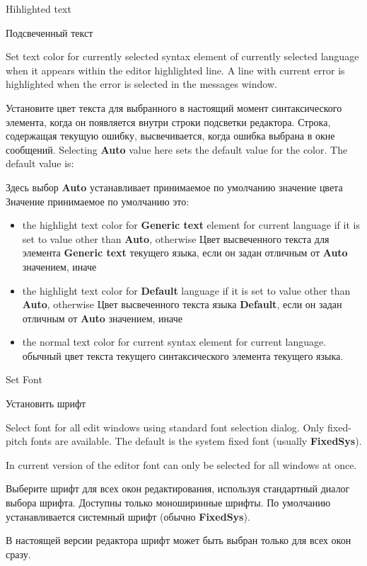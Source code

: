 \begin{popup}
\ifenglish
\caption{Hihlighted text}
\else
\caption{Подсвеченный текст}
\fi
{}

\ifenglish
Set text color for currently selected syntax element of currently selected
language when it appears within the editor highlighted line.
A line with current error is highlighted when the error is selected in the
messages window.

\else
Установите цвет текста для выбранного в настоящий момент синтаксического элемента,
когда он появляется внутри строки подсветки редактора.
Строка, содержащая текущую ошибку, высвечивается, когда ошибка выбрана в окне
сообщений.
\fi
\ifenglish
Selecting {\bf Auto} value here sets the default value for the color. The default
value is:

\else
Здесь выбор {\bf Auto} устанавливает принимаемое по умолчанию значение цвета
Значение принимаемое по умолчанию это:
\fi
\begin{itemize}
\item 
 \ifenglish
 the highlight text color for {\bf Generic text} element for current language
 if it is set  to value other than {\bf Auto}, otherwise
\else
  Цвет высвеченного текста для элемента {\bf Generic text} текущего языка, если он
 задан отличным от {\bf Auto} значением, иначе
 \fi
\item 
 \ifenglish
 the highlight text color for {\bf Default} language
 if it is set  to value other than {\bf Auto}, otherwise
 \else
  Цвет высвеченного текста языка {\bf Default}, если он
  задан отличным от {\bf Auto} значением, иначе
 \fi
\item 
 \ifenglish
 the normal text color for current syntax element for current language.
 \else
 обычный цвет текста текущего синтаксического элемента текущего языка.
 \fi
\end{itemize}
\end{popup}

\begin{popup}
\ifenglish
\caption{Set Font}
\else
\caption{Установить шрифт}
\fi
{}
\ifenglish
Select font for all edit windows using standard font selection dialog.
Only fixed-pitch fonts are available. The default is the system fixed font
(usually {\bf FixedSys}).

In current version of the editor font can only be selected for all windows
at once.

\else
Выберите шрифт для всех окон редактирования, используя стандартный диалог
выбора шрифта. Доступны только моноширинные шрифты. По умолчанию устанавливается 
системный шрифт (обычно {\bf FixedSys}).

В настоящей версии редактора шрифт может быть выбран только для всех окон сразу.
\fi
\end{popup}


